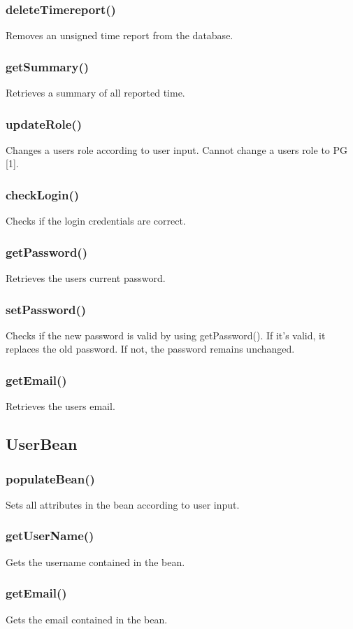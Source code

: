 \documentclass{article}
\begin{document}
\subsubsection{deleteTimereport()}
Removes an unsigned time report from the database. 

\subsubsection{getSummary()}
Retrieves a summary of all reported time.
\subsubsection{updateRole()}
Changes a users role according to user input. Cannot change a users role to PG [1].
\subsubsection{checkLogin()}
Checks if the login credentials are correct.
\subsubsection{getPassword()}
Retrieves the users current password.
\subsubsection{setPassword()}
Checks if the new password is valid by using getPassword(). If it's valid, it replaces the old password. If not, the password remains unchanged.
\subsubsection{getEmail()}
Retrieves the users email.

\subsection{UserBean}
\subsubsection{populateBean()}
Sets all attributes in the bean according to user input.
\subsubsection{getUserName()}
Gets the username contained in the bean.
\subsubsection{getEmail()}
Gets the email contained in the bean.
\end{document}
